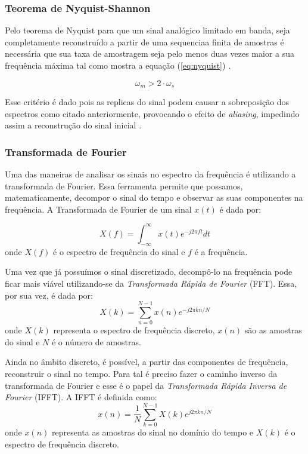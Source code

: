\documentclass[journal]{IEEEtran}
\begin{document}
\subsubsection{Teorema de Nyquist-Shannon}

Pelo teorema de Nyquist para que um sinal analógico limitado em banda, seja completamente reconstruído a partir de uma sequenciaa finita de amostras é necessária que sua taxa de amostragem seja pelo menos duas vezes maior a sua frequência máxima tal como mostra a equação (\ref{eq:nyquist}) \cite{alan}.

\begin{equation}\label{eq:nyquist}
    \omega_{m} > 2 \cdot \omega_{s}
\end{equation}

Esse critério é dado pois as replicas do sinal podem causar a sobreposição dos espectros como citado anteriormente, provocando o efeito de \textit{aliasing}, impedindo assim a reconstrução do sinal inicial \cite{alan}.

\subsubsection{Transformada de Fourier}
Uma das maneiras de analisar os sinais no espectro da frequência é utilizando a transformada de Fourier. Essa ferramenta permite que possamos, matematicamente, decompor o sinal do tempo e observar as suas componentes na frequência\cite{brigham1988fast}. A Transformada de Fourier de um sinal $x(t)$ é dada por:

\begin{equation}
     X(f) = \int_{-\infty}^{\infty} x(t) e^{-j2\pi ft} dt
\end{equation}
onde \(X(f)\) é o espectro de frequência do sinal e \(f\) é a frequência.

Uma vez que já possuímos o sinal discretizado, decompô-lo na frequência pode ficar mais viável utilizando-se da \textit{Transformada Rápida de Fourier} (FFT)\cite{brigham1988fast}. Essa, por sua vez, é dada por:
\begin{equation}
    X(k) = \sum_{n=0}^{N-1} x(n) e^{-j2\pi kn/N} 
\end{equation}
onde \(X(k)\) representa o espectro de frequência discreto, \(x(n)\) são as amostras do sinal e \(N\) é o número de amostras.

Ainda no âmbito discreto, é possível, a partir das componentes de frequência, reconstruir o sinal no tempo. Para tal é preciso fazer o caminho inverso da transformada de Fourier e esse é o papel da \textit{Transformada Rápida Inversa de Fourier} (IFFT)\cite{brigham1988fast}. A IFFT é definida como:
\begin{equation}
    x(n) = \frac{1}{N} \sum_{k=0}^{N-1} X(k) e^{j2\pi kn/N}
\end{equation}
onde \(x(n)\) representa as amostras do sinal no domínio do tempo e \(X(k)\) é o espectro de frequência discreto.
\end{document}
